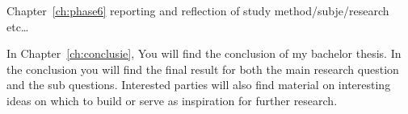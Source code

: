 Chapter~\ref{ch:phase6} reporting and reflection of study method/subje/research etc\ldots



In Chapter~\ref{ch:conclusie}, You will find the conclusion of my bachelor thesis. In the conclusion you will find the final result for both the main research question and the sub questions. Interested parties will also find material on interesting ideas on which to build or serve as inspiration for further research.

